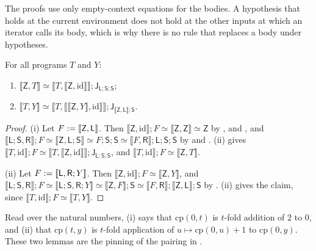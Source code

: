 The proofs use only empty-context equations for the bodies.  A hypothesis
that holds at the current environment does not hold at the other inputs
at which an iterator calls its body, which is why there is no rule that
replaces a body under hypotheses.

\begin{lemma}
\label{base:lem:pf-pair}
For all programs $T$ and $Y$:
\begin{enumerate}[label=\textup{(\roman*)}]
\item $\llbracket\mathsf Z,T\rrbracket\simeq
 \llbracket T,\llbracket\mathsf Z,\mathrm{id}\rrbracket\rrbracket;
 \mathsf J_{\mathsf L;\mathsf S;\mathsf S}$;
\item $\llbracket T,Y\rrbracket\simeq
 \llbracket T,\llbracket\llbracket\mathsf Z,Y\rrbracket,\mathrm{id}\rrbracket\rrbracket;
 \mathsf J_{\llbracket\mathsf Z,\mathsf L\rrbracket;\mathsf S}$.
\end{enumerate}
\end{lemma}

\begin{proof}
(i) Let $F\mathrel{:=}[\![\mathsf Z,\mathsf L]\!]$.  Then
$\llbracket\mathsf Z,\mathrm{id}\rrbracket;F\simeq
\llbracket\mathsf Z,\mathsf Z\rrbracket\simeq\mathsf Z$ by ,
 and , and
$\llbracket\mathsf L;\mathsf S,\mathsf R\rrbracket;F\simeq
\llbracket\mathsf Z,\mathsf L;\mathsf S\rrbracket\simeq F;\mathsf S;\mathsf S
\simeq\llbracket F,\mathsf R\rrbracket;\mathsf L;\mathsf S;\mathsf S$ by
 and .  (ii) gives
$\llbracket T,\mathrm{id}\rrbracket;F\simeq
\llbracket T,\llbracket\mathsf Z,\mathrm{id}\rrbracket\rrbracket;
\mathsf J_{\mathsf L;\mathsf S;\mathsf S}$, and
$\llbracket T,\mathrm{id}\rrbracket;F\simeq\llbracket\mathsf Z,T\rrbracket$.

(ii) Let $F\mathrel{:=}[\![\mathsf L,\mathsf R;Y]\!]$.  Then
$\llbracket\mathsf Z,\mathrm{id}\rrbracket;F\simeq\llbracket\mathsf Z,Y\rrbracket$,
and $\llbracket\mathsf L;\mathsf S,\mathsf R\rrbracket;F\simeq
\llbracket\mathsf L;\mathsf S,\mathsf R;Y\rrbracket\simeq
\llbracket\mathsf Z,F\rrbracket;\mathsf S\simeq
\llbracket F,\mathsf R\rrbracket;\llbracket\mathsf Z,\mathsf L\rrbracket;\mathsf S$
by .  (ii) gives the claim, since
$\llbracket T,\mathrm{id}\rrbracket;F\simeq\llbracket T,Y\rrbracket$.
\end{proof}

Read over the natural numbers, (i) says that $\mathrm{cp}(0,t)$ is $t$-fold
addition of $2$ to $0$, and (ii) that $\mathrm{cp}(t,y)$ is $t$-fold
application of $u\mapsto\mathrm{cp}(0,u)+1$ to $\mathrm{cp}(0,y)$.  These
two lemmas are the pinning of the pairing in .

